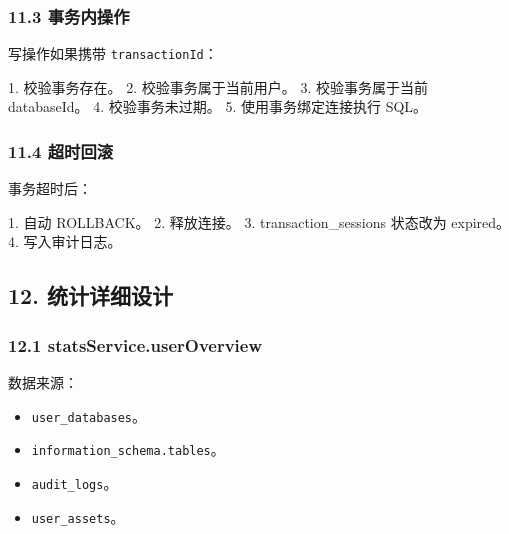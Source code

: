 \documentclass[
  a4paper,
  UTF8]{ctexart}
\newenvironment{Shaded}{}{}
\newcommand{\NormalTok}[1]{#1}
\providecommand{\tightlist}{%
  \setlength{\itemsep}{0pt}\setlength{\parskip}{0pt}}
\begin{document}
\hypertarget{ux4e8bux52a1ux5185ux64cdux4f5c}{%
\subsubsection{11.3 事务内操作}\label{ux4e8bux52a1ux5185ux64cdux4f5c}}

写操作如果携带 \texttt{transactionId}：

\begin{Shaded}
\begin{Highlighting}[]
\NormalTok{1. 校验事务存在。}
\NormalTok{2. 校验事务属于当前用户。}
\NormalTok{3. 校验事务属于当前 databaseId。}
\NormalTok{4. 校验事务未过期。}
\NormalTok{5. 使用事务绑定连接执行 SQL。}
\end{Highlighting}
\end{Shaded}

\hypertarget{ux8d85ux65f6ux56deux6eda}{%
\subsubsection{11.4 超时回滚}\label{ux8d85ux65f6ux56deux6eda}}

事务超时后：

\begin{Shaded}
\begin{Highlighting}[]
\NormalTok{1. 自动 ROLLBACK。}
\NormalTok{2. 释放连接。}
\NormalTok{3. transaction\_sessions 状态改为 expired。}
\NormalTok{4. 写入审计日志。}
\end{Highlighting}
\end{Shaded}

\hypertarget{ux7edfux8ba1ux8be6ux7ec6ux8bbeux8ba1}{%
\subsection{12.
统计详细设计}\label{ux7edfux8ba1ux8be6ux7ec6ux8bbeux8ba1}}

\hypertarget{statsservice.useroverview}{%
\subsubsection{12.1
statsService.userOverview}\label{statsservice.useroverview}}

数据来源：

\begin{itemize}
\tightlist
\item
  \texttt{user\_databases}。
\item
  \texttt{information\_schema.tables}。
\item
  \texttt{audit\_logs}。
\item
  \texttt{user\_assets}。
\end{itemize}
\end{document}
